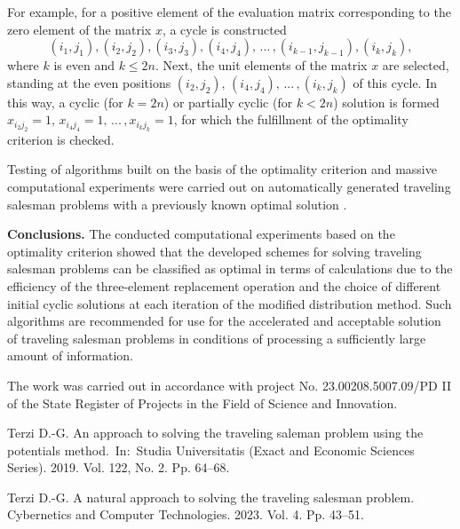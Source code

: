 \documentclass[12pt]{llncs}
\begin{document}
      For example, for a positive element of the evaluation matrix corresponding to the zero element of the
     matrix $x$, a cycle is constructed
     $$(i_{1} ,j_{1} ),(i_{2} ,j_{2} ),(i_{3} ,j_{3} ),(i_{4} ,j_{4} ),\,...\,,(i_{k-1} ,j_{k-1} ),(i_{k} ,j_{k} ),$$
     where
      $k$ is even and $k \leq 2n$. Next, the unit elements of the matrix $x$ are selected, standing at the even positions
      $(i_{2} ,j_{2} ), \, (i_{4} ,j_{4} ),\,  ...\, , (i_{k} ,j_{k} )$ of this cycle. In this way, a cyclic (for $k=2n$) or partially cyclic (for $k<2n$)
       solution is formed $x_{i_{2} j_{2} } =1, \,x_{i_{4} j_{4} } =1,\,...\,, x_{i_{k} j_{k} } =1$,
       for which the fulfillment of the optimality criterion is checked.

     Testing of algorithms built on the basis of the optimality criterion and massive computational experiments were carried out on automatically
     generated traveling salesman problems with a previously known optimal solution \cite{Terzi2}.


\textbf{Conclusions.} The conducted computational experiments based on the optimality criterion showed that the developed schemes for solving traveling
 salesman problems can be classified as optimal in terms of calculations due to the efficiency of the three-element replacement operation and the choice
  of different initial cyclic solutions at each iteration of the modified distribution method. Such algorithms are recommended for use for the accelerated
  and acceptable solution of traveling salesman problems in conditions of processing a sufficiently large amount of information.

     The work was carried out in accordance with project No. 23.00208.5007.09/PD II of the State Register of Projects in the Field of Science and Innovation.
  \begin{thebibliography}{9} %

     Terzi D.-G. An approach to solving the traveling saleman problem using the potentials method.~In:~Studia Universitatis (Exact and Economic Sciences Series). 2019. Vol. 122, No. 2.  Pp. 64--68.

          Terzi D.-G. A natural approach to solving the traveling salesman problem. Cybernetics and Computer Technologies. 2023.  Vol. 4. Pp. 43--51.
     \end{thebibliography}

 
\end{document}
